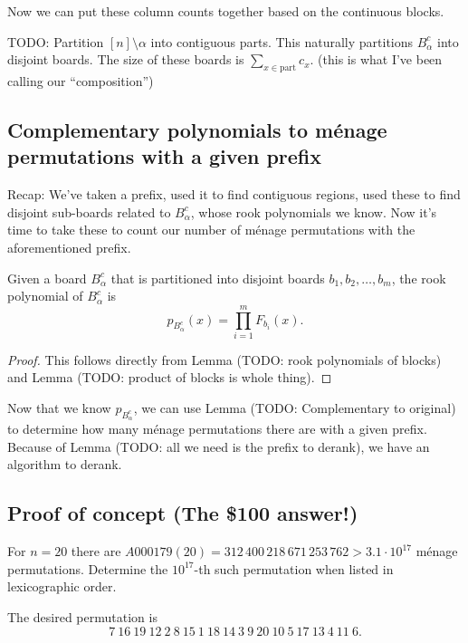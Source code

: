 Now we can put these column counts together based on the continuous blocks.

\begin{lemma}
  TODO:
  Partition $[n] \setminus \alpha$ into contiguous parts.
  This naturally partitions $B^c_\alpha$ into disjoint boards.
  The size of these boards is $\sum_{x \in \textrm{part}} c_x$.
  (this is what I've been calling our ``composition'')
\end{lemma}

% 

\subsection{Complementary polynomials to m\'enage permutations with a given prefix}
Recap: We've taken a prefix, used it to find contiguous regions, used these to
find disjoint sub-boards related to $B_\alpha^c$, whose rook polynomials we know.
Now it's time to take these to count our number of m\'enage permutations with
the aforementioned prefix.
\begin{lemma}
  Given a board $B_\alpha^c$ that is partitioned into disjoint boards
  $b_1, b_2, \dots, b_m$, the rook polynomial of $B_\alpha^c$ is \[
    p_{B_\alpha^c}(x) = \prod_{i = 1}^m F_{b_i}(x).
  \]
\end{lemma}
\begin{proof}
  This follows directly from Lemma (TODO: rook polynomials of blocks)
  and Lemma (TODO: product of blocks is whole thing).
\end{proof}

Now that we know $p_{B_\alpha^c}$, we can use Lemma
(TODO: Complementary to original) to determine how many
m\'enage permutations there are with a given prefix. Because of Lemma
(TODO: all we need is the prefix to derank), we have an algorithm to derank.

\subsection{Proof of concept (The \$100 answer!)}
\begin{problem}
  For $n=20$ there are $A000179(20) = 312\,400\,218\,671\,253\,762 > 3.1\cdot 10^{17}$
  m\'enage permutations.
  Determine the $10^{17}$-th such permutation when listed in lexicographic order.
\end{problem}
\begin{answer}
  The desired permutation is \begin{equation}
    7\ 16\ 19\ 12\ 2\ 8\ 15\ 1\ 18\ 14\ 3\ 9\ 20\ 10\ 5\ 17\ 13\ 4\ 11\ 6.
  \end{equation}
\end{answer}


